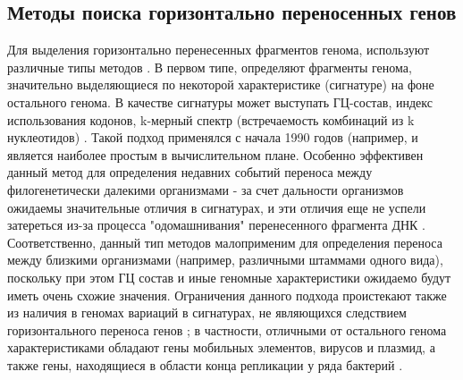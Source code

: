 \subsection{Методы поиска горизонтально переносенных генов}
Для выделения горизонтально перенесенных фрагментов генома, используют различные типы методов \cite{sevillya2020detecting}. В первом типе, определяют фрагменты генома, значительно выделяющиеся по некоторой характеристике (сигнатуре) на фоне остального генома. В качестве сигнатуры может выступать ГЦ-состав, индекс использования кодонов, k-мерный спектр (встречаемость комбинаций из k нуклеотидов) \cite{garcia2000horizontal}. Такой подход применялся с начала 1990 годов (например, \cite{medigue1991evidence} и является наиболее простым в вычислительном плане. Особенно эффективен данный метод для определения недавних событий переноса между филогенетически далекими организмами - за счет дальности организмов ожидаемы значительные отличия в сигнатурах, и эти отличия еще не успели затереться из-за процесса "одомашнивания" перенесенного фрагмента ДНК \cite{marri2008gene}. Соответственно, данный тип методов малоприменим для определения переноса между близкими организмами (например, различными штаммами одного вида), поскольку при этом ГЦ состав и иные геномные характеристики ожидаемо будут иметь очень схожие значения. Ограничения данного подхода проистекают также из наличия в геномах вариаций в сигнатурах, не являющихся следствием горизонтального переноса генов \cite{koski2001codon, gogarten2005horizontal}; в частности, отличными от остального генома характеристиками обладают гены мобильных элементов, вирусов и плазмид, а также гены, находящиеся в области конца репликации у ряда бактерий \cite{daubin2003source}. 

